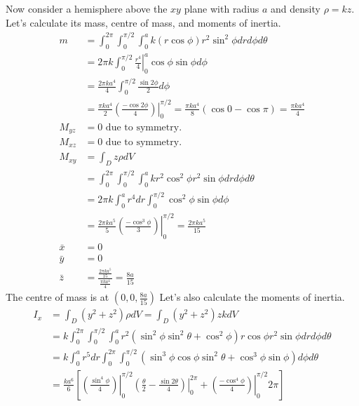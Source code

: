 \documentclass[fleqn,letterpaper]{report}
\begin{document}
\begin{example}
Now consider a hemisphere above the $xy$ plane with radius
$a$ and density $\rho = kz$. Let's calculate its mass, centre
of mass, and moments of inertia.
\begin{align*}
m & = \int_0^{2\pi} \int_0^{\pi/2} \int_0^a k (r\cos \phi) r^2
\sin^2\phi dr d\phi d\theta \\
& = 2\pi k \int_0^{\pi/2} \left. \frac{r^4}{4} \right|_0^a
\cos \phi \sin \phi d\phi \\
& = \frac{2\pi ka^4}{4} \int_0^{\pi/2} \frac{\sin 2\phi}{2}
d\phi \\
& = \frac{\pi ka^4}{2} \left. \left( \frac{-\cos2\phi}{4}
\right) \right|_0^{\pi/2} = \frac{\pi ka^4}{8} ( \cos 0 - \cos
\pi) = \frac{\pi ka^4}{4} \\
M_{yz} & = 0 \text{ due to symmetry.} \\
M_{xz} & = 0 \text{ due to symmetry.} \\
M_{xy} & = \int_D z \rho dV \\
& = \int_0^{2\pi} \int_0^{\pi/2}
\int_0^a kr^2 \cos^2\phi r^2 \sin \phi dr d\phi d\theta \\
& = 2\pi k \int_0^a r^4 dr \int_0^{\pi/2} \cos^2 \phi \sin
\phi d \phi \\
& = \frac{2\pi k a^5}{5} \left. \left( \frac{-\cos^3 \phi}{3}
\right) \right|_0^{\pi/2} = \frac{2\pi k a^5}{15} \\
\bar{x} & = 0 \\
\bar{y} & = 0 \\
\bar{z} & = \frac{\frac{2\pi ka^5}{15}}{\frac{\pi ka^4}{4}} =
\frac{8a}{15} 
\end{align*}
The centre of mass is at $(0,0, \frac{8a}{15})$
Let's also calculate the moments of inertia.
\begin{align*}
I_x & = \int_D (y^2 + z^2) \rho dV = \int_D (y^2 + z^2) z k dV
\\
& = k \int_0^{2\pi} \int_0^{\pi/2} \int_0^a r^2 (\sin^2 \phi
\sin^2 \theta + \cos^2 \phi) r \cos \phi r^2 \sin\phi drd\phi
d\theta \\
& = k \int_0^a r^5 dr \int_0^{2\pi} \int_0^{\pi/2} \left(
\sin^3 \phi \cos \phi \sin^2 \theta + \cos^3 \phi \sin \phi
\right) d\phi d\theta \\
& = \frac{ka^6}{6} \left[ \left. \left( \frac{\sin^4 \phi}{4}
\right) \right|_0^{\pi/2} \left. \left( \frac{\theta}{2} -
\frac{\sin 2\theta}{4} \right) \right|_0^{2\pi} + \left.
\left( \frac{-\cos^4 \phi}{4} \right) \right|_0^{\pi/2} 2\pi 
\right] \\

\end{align*}
\end{example}
\end{document}
